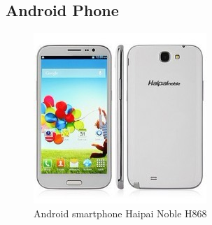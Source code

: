 






\newpage
\subsection{Android Phone}

	\begin{figure}[H]
			\centering
			\includegraphics[scale=0.8]{images/ProjectComponents/android.jpg}
			\caption{Android smartphone Haipai Noble H868}
			\label{}
	\end{figure}
	\bigskip


